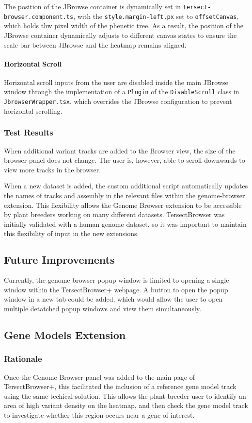 \documentclass[12pt]{article}
\begin{document}
The position of the JBrowse container is dynamically set in \verb+tersect-browser.component.ts+, with the \verb+style.margin-left.px+ set to \verb+offsetCanvas+, which holds thw pixel width of the phenetic tree. As a result, the position of the JBrowse container dynamically adjusts to different canvas states to ensure the scale bar between JBrowse and the heatmap remains aligned. 

\paragraph{Horizontal Scroll}
Horizontal scroll inputs from the user are disabled inside the main JBrowse window through the implementation of a \verb+Plugin+ of the \verb+DisableScroll+ class in \verb+JbrowserWrapper.tsx+, which overrides the JBrowse configuration to prevent horizontal scrolling.


\subsubsection{Test Results}
When additional variant tracks are added to the Browser view, the size of the browser panel does not change. The user is, however, able to scroll downwards to view more tracks in the browser. 

When a new dataset is added, the custom additional script automatically updates the names of tracks and assembly in the relevant files within the genome-browser extension. This flexibility allows the Genome Browser extension to be accessible by plant breeders working on many different datasets. TersectBrowser was initially validated with a human genome dataset, so it was important to maintain this flexibility of input in the new extensions.

\subsection{Future Improvements}
Currently, the genome browser popup window is limited to opening a single window within the TersectBrowser+ webpage. A button to open the popup window in a new tab could be added, which would allow the user to open multiple detatched popup windows and view them simultaneously.


\subsection{Gene Models Extension}
\label{sec:Models}
\subsubsection{Rationale}
Once the Genome Browser panel was added to the main page of TersectBrowser+, this facilitated the inclusion of a reference gene model track using the same techical solution. This allows the plant breeder user to identify an area of high variant density on the heatmap, and then check the gene model track to investigate whether this region occurs near a gene of interest.
\end{document}

